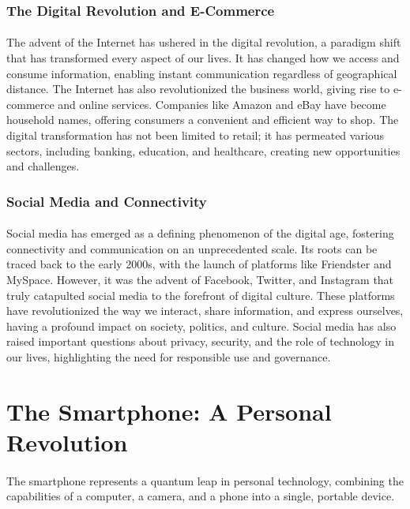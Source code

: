 \documentclass{book}
\begin{document}
\subsubsection*{The Digital Revolution and E-Commerce}
\paragraph{}
The advent of the Internet has ushered in the digital revolution, a paradigm shift that has transformed every aspect of our lives. It has changed how we access and consume information, enabling instant communication regardless of geographical distance. The Internet has also revolutionized the business world, giving rise to e-commerce and online services. Companies like Amazon and eBay have become household names, offering consumers a convenient and efficient way to shop. The digital transformation has not been limited to retail; it has permeated various sectors, including banking, education, and healthcare, creating new opportunities and challenges.

\subsubsection*{Social Media and Connectivity}
\paragraph{}
Social media has emerged as a defining phenomenon of the digital age, fostering connectivity and communication on an unprecedented scale. Its roots can be traced back to the early 2000s, with the launch of platforms like Friendster and MySpace. However, it was the advent of Facebook, Twitter, and Instagram that truly catapulted social media to the forefront of digital culture. These platforms have revolutionized the way we interact, share information, and express ourselves, having a profound impact on society, politics, and culture. Social media has also raised important questions about privacy, security, and the role of technology in our lives, highlighting the need for responsible use and governance.

\section*{The Smartphone: A Personal Revolution}
\paragraph{}
The smartphone represents a quantum leap in personal technology, combining the capabilities of a computer, a camera, and a phone into a single, portable device.
\end{document}
